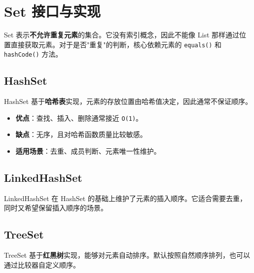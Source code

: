 
\section{Set 接口与实现}
Set 表示\textbf{不允许重复元素}的集合。它没有索引概念，因此不能像 List 那样通过位置直接获取元素。对于是否"重复"的判断，核心依赖元素的 \texttt{equals()} 和 \texttt{hashCode()} 方法。

\subsection{HashSet}
HashSet 基于\textbf{哈希表}实现，元素的存放位置由哈希值决定，因此通常不保证顺序。

\begin{itemize}
    \item \textbf{优点}：查找、插入、删除通常接近 \texttt{O(1)}。
    \item \textbf{缺点}：无序，且对哈希函数质量比较敏感。
    \item \textbf{适用场景}：去重、成员判断、元素唯一性维护。
\end{itemize}

\subsection{LinkedHashSet}
LinkedHashSet 在 HashSet 的基础上维护了元素的插入顺序。它适合需要去重，同时又希望保留插入顺序的场景。

\subsection{TreeSet}
TreeSet 基于\textbf{红黑树}实现，能够对元素自动排序。默认按照自然顺序排列，也可以通过比较器自定义顺序。

